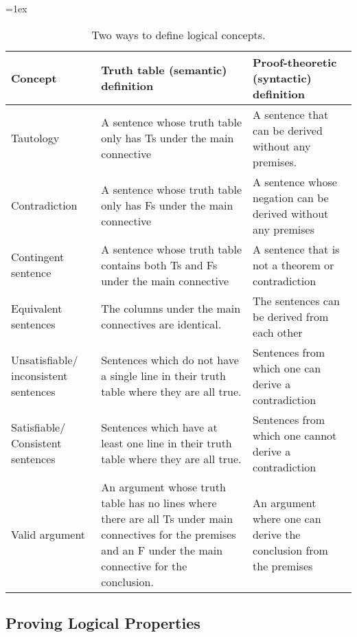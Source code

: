 \documentclass[12pt, a4paper, twoside, openright, titlepage]{book}
\begin{document}
\begin{table}[H]
\tabulinesep=1ex
\begin{tabu}{X[.5,c,m] ||X[1,l,m] |X[1,l,m]}
\textbf{Concept} 		&	\textbf{Truth table (semantic) definition} 	&	\textbf{Proof-theoretic (syntactic) definition} \\ \hline \hline

Tautology   &	A sentence whose truth table only has Ts under the main connective & A sentence that can be derived without any premises.	 \\ \hline
 
Contradiction		&	A sentence whose truth table only has Fs under the main connective  &	A sentence whose negation can be derived without any premises\\ \hline

Contingent sentence	&	A sentence whose truth table contains both Ts and Fs under the main connective & A sentence that is not a theorem or contradiction \\ \hline

Equivalent sentences &	The columns under the main connectives are identical.& The sentences can be derived from each other	\\ \hline

Unsatisfiable/ inconsistent sentences	&	Sentences which do not have a single line in their truth table where they are all true.	& Sentences  from which one can derive a contradiction \\ \hline

Satisfiable/ Consistent sentences	&	Sentences which have at least one line in their truth table where they are all true. & Sentences from which one cannot derive a contradiction	\\ \hline

Valid argument		&	An argument whose truth table has no lines where there are all Ts under main connectives for the premises and an F under the main connective for the conclusion.  & An argument where one can derive the conclusion from the premises	\\ 
\end{tabu}
\caption{Two ways to define logical concepts.}
\label{table:truth_tables_or_derivations}
\end{table}

\subsection{\textsection Proving Logical Properties}
\end{document}
